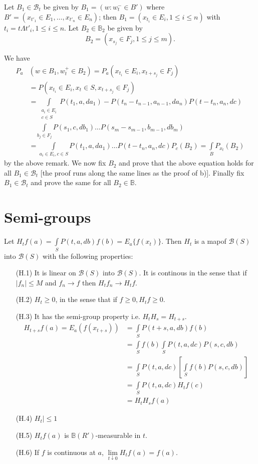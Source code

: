 Let $B_1 \in \mathscr{B}_t$ be given by $B_1 = (w: w^-_t \in B')$
where $B' = (x_{t'_1} \in  E_1 , \ldots , x_{t'_n} \in E_n)$; then
$B_1= (x_{t_i} \in E_i, 1 \le i \le n)$ with $t_i = t \Lambda t'_i, 1
\le i \le n$. Let $B_2 \in \mathbb{B}_2 $ be given by  
$$
B_2 = (x_{s_j} \in F_j , 1 \le j \le m). 
$$

We have
\begin{align*}
  P_a & ( w \in B_1 , w^+_t \in  B_2) = P_a (x_{t_i} \in  E_i, x_{t+s_j}
  \in F_j)\\ 
  & = P (x_{t_i} \in E_i, x_t \in S, x_{t+s_j} \in F_j)\\
  & = \int\limits_{\substack{a_i \in E_i \\ c \in  S}}P(t_1,  a,  da_1 )
  - P(t_n - t_{n-1}, a_{n-1}, da_n) P (t- t_{n}, a_n, dc )\\
  & \quad \int\limits_{b_j \in F_j} P(s_1, c, db_{1}) \ldots P (s_m- s_{m-1} ,
  b_{m-1}, db_m) \\ 
  & = \int\limits_{a_i \in E_i , c \in S}P(t_1, a, da_1) \ldots P(t-
  t_{n}, a_n , dc) P_c (B_2)= \int\limits_{B} P_{x_t} (B_2) 
\end{align*}
by the above remark. We now fix $B_2$ and prove that the above
equation holds for all $B_1 \in \mathscr{B}_t$ [the proof runs along
  the same lines as the proof of b)]. Finally fix $B_1 \in
\mathscr{B}_t$ and prove the same for all $B_2 \in \mathbb{B}$. 

\section{Semi-groups}\label{chap1-sec4}

Let $H_t f (a) = \int\limits_{S} P(t,a, db) f(b) = E_a \{
f(x_t)\}$. Then $H_t$ is a map\pageoriginale of $\mathscr{B}(S)$ into
$\mathscr{B}(S)$ with the following properties: 
\begin{itemize}
\item[(H.1)] It is linear  on $\mathscr{B} (S)$ into
  $\mathscr{B}(S)$. It is continous in the sense that if $|f_n |  \le
  M$ and $f_n  \to f$ then $H_t f_n \to H_t f$. 
\item[(H.2)] $H_t \ge 0$, in the sense that if $f \ge 0, H_t f \ge 0$. 
\item[(H.3)] It has the semi-group property i.e. $H_t H_s= H_{t+s}$.
  \begin{align*}
    H_{t+s}f(a) = E_a(f (x_{t+s})) &= \int\limits_{S}P(t+s, a, db ) f(b) \\
    &= \int\limits_{S} f(b) \int\limits_{S} P(t,a,dc) P(s,c, db) \\
    &= \int\limits_{S} P(t,a,dc) \left[ \int\limits_{S} f(b) P(s,c,db)\right] \\
    &= \int\limits_{S} P(t,a,dc) H_t f(c)\\
    &=  H_t H_s f(a)
  \end{align*}

\item[(H.4)]  $H_t |  \le 1$
\item[(H.5)] $H_t f(a) $ is $\mathbb{B}(R')$-measurable in $t$. 
\item[(H.6)] If $f$ is continuous at $a$, $\lim\limits_{t \downarrow
  0} H_t f(a) = f(a)$. 
\end{itemize}


